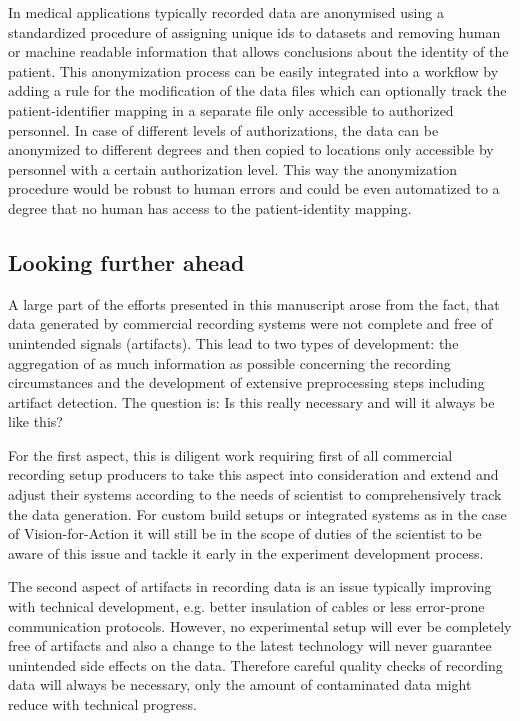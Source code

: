 In medical applications typically recorded data are anonymised using a standardized procedure of assigning unique ids to datasets and removing human or machine readable information that allows conclusions about the identity of the patient. This anonymization process can be easily integrated into a workflow by adding a rule for the modification of the data files which can optionally track the patient-identifier mapping in a separate file only accessible to authorized personnel. In case of different levels of authorizations, the data can be anonymized to different degrees and then copied to locations only accessible by personnel with a certain authorization level. This way the anonymization procedure would be robust to human errors and could be even automatized to a degree that no human has access to the patient-identity mapping.



\subsection{Looking further ahead}
A large part of the efforts presented in this manuscript arose from the fact, that data generated by commercial recording systems were not complete and free of unintended signals (artifacts). This lead to two types of development: the aggregation of as much information as possible concerning the recording circumstances and the development of extensive preprocessing steps including artifact detection. The question is: Is this really necessary and will it always be like this?

For the first aspect, this is diligent work requiring first of all commercial recording setup producers to take this aspect into consideration and extend and adjust their systems according to the needs of scientist to comprehensively track the data generation. For custom build setups or integrated systems as in the case of Vision-for-Action it will still be in the scope of duties of the scientist to be aware of this issue and tackle it early in the experiment development process.

The second aspect of artifacts in recording data is an issue typically improving with technical development, e.g. better insulation of cables or less error-prone communication protocols. However, no experimental setup will ever be completely free of artifacts and also a change to the latest technology will never guarantee unintended side effects on the data. Therefore careful quality checks of recording data will always be necessary, only the amount of contaminated data might reduce with technical progress.


